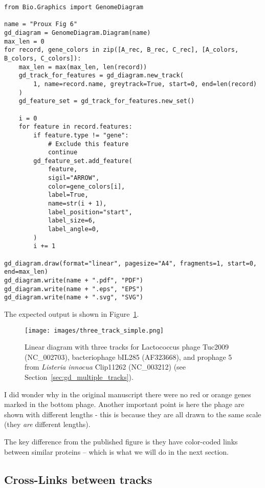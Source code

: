 \begin{verbatim}
from Bio.Graphics import GenomeDiagram

name = "Proux Fig 6"
gd_diagram = GenomeDiagram.Diagram(name)
max_len = 0
for record, gene_colors in zip([A_rec, B_rec, C_rec], [A_colors, B_colors, C_colors]):
    max_len = max(max_len, len(record))
    gd_track_for_features = gd_diagram.new_track(
        1, name=record.name, greytrack=True, start=0, end=len(record)
    )
    gd_feature_set = gd_track_for_features.new_set()

    i = 0
    for feature in record.features:
        if feature.type != "gene":
            # Exclude this feature
            continue
        gd_feature_set.add_feature(
            feature,
            sigil="ARROW",
            color=gene_colors[i],
            label=True,
            name=str(i + 1),
            label_position="start",
            label_size=6,
            label_angle=0,
        )
        i += 1

gd_diagram.draw(format="linear", pagesize="A4", fragments=1, start=0, end=max_len)
gd_diagram.write(name + ".pdf", "PDF")
gd_diagram.write(name + ".eps", "EPS")
gd_diagram.write(name + ".svg", "SVG")
\end{verbatim}

\noindent The expected output is shown in Figure~\ref{fig:three_track_simple}.
\begin{figure}[htbp]
\centering
\texttt{[image: images/three\_track\_simple.png]}
\caption{Linear diagram with three tracks for Lactococcus phage Tuc2009
(NC\_002703), bacteriophage bIL285 (AF323668), and prophage 5 from
\textit{Listeria innocua} Clip11262 (NC\_003212)
(see Section~\ref{sec:gd_multiple_tracks}).}
\label{fig:three_track_simple}
\end{figure}
I did wonder why in the original manuscript there were no red or orange genes
marked in the bottom phage. Another important point is here the phage are
shown with different lengths - this is because they are all drawn to the same
scale (they \emph{are} different lengths).

The key difference from the published figure is they have color-coded links
between similar proteins -- which is what we will do in the next section.

\subsection{Cross-Links between tracks}
\label{sec:gd_cross_links}

